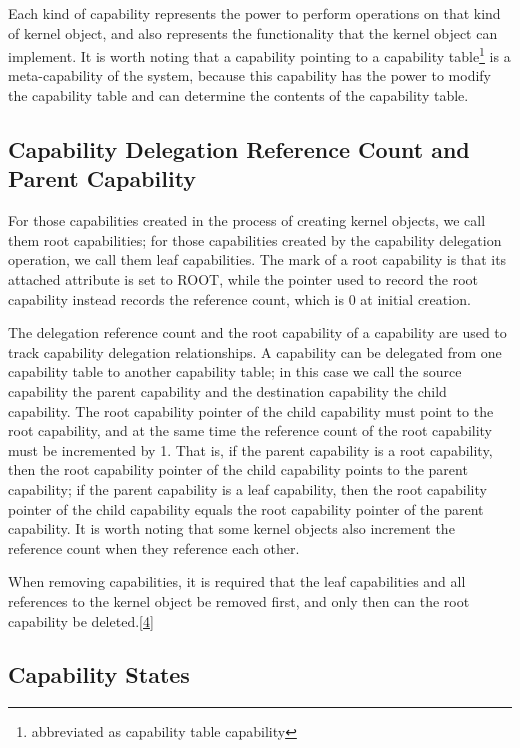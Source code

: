 Each kind of capability represents the power to perform operations on that kind of kernel object, and also represents the functionality that the kernel object can implement. It is worth noting that a capability pointing to a capability table\footnote{abbreviated as capability table capability} is a meta-capability of the system, because this capability has the power to modify the capability table and can determine the contents of the capability table.

\subsection{Capability Delegation Reference Count and Parent Capability}\label{subsec:2-reference-count-and-parent-capability}

For those capabilities created in the process of creating kernel objects, we call them root capabilities; for those capabilities created by the capability delegation operation, we call them leaf capabilities. The mark of a root capability is that its attached attribute is set to ROOT, while the pointer used to record the root capability instead records the reference count, which is 0 at initial creation.

The delegation reference count and the root capability of a capability are used to track capability delegation relationships. A capability can be delegated from one capability table to another capability table; in this case we call the source capability the parent capability and the destination capability the child capability. The root capability pointer of the child capability must point to the root capability, and at the same time the reference count of the root capability must be incremented by 1. That is, if the parent capability is a root capability, then the root capability pointer of the child capability points to the parent capability; if the parent capability is a leaf capability, then the root capability pointer of the child capability equals the root capability pointer of the parent capability. It is worth noting that some kernel objects also increment the reference count when they reference each other.

When removing capabilities, it is required that the leaf capabilities and all references to the kernel object be removed first, and only then can the root capability be deleted.\hyperref[cite:2-4]{{[}4{]}}

\subsection{Capability States}\label{subsec:2-capability-states}

